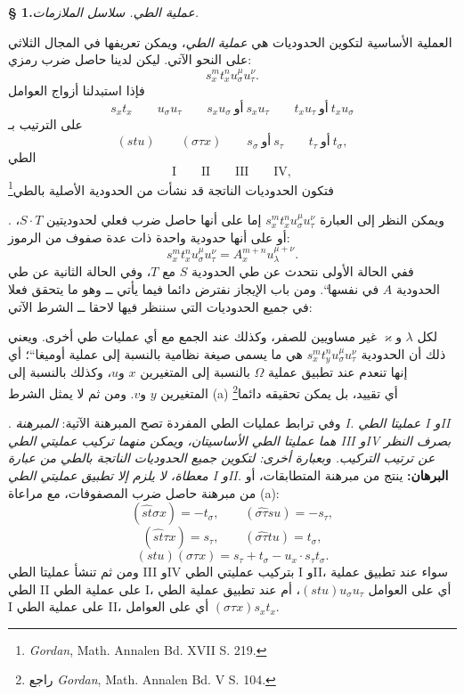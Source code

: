 \documentclass[11pt]{article}
\providecommand{\glqq}{\textquotedblbase}
\providecommand{\grqq}{\textquotedblleft}
\providecommand{\srcnumdisplay}[3][3.4em]{%
  \par\smallskip\noindent
  \babelsublr{\begin{minipage}[t]{#1}\vspace*{0pt}\srcLTR{#2}\end{minipage}%
  \begin{minipage}[t]{\dimexpr\linewidth-#1\relax}\vspace*{0pt}\centering
  \(\displaystyle #3\)\end{minipage}}\par\smallskip}
\newcommand{\srcLTR}[1]{\relax\ifmmode\text{\mbox{\babelsublr{\foreignlanguage{english}{#1}}}}\else\babelsublr{\foreignlanguage{english}{#1}}\fi}
\newcommand{\srcfn}[2]{\begingroup\renewcommand{\thefootnote}{\srcLTR{#1}}\footnote{#2}\addtocounter{footnote}{-1}\endgroup}
\begin{document}
\begin{center}
\textbf{§ 1.}\quad \emph{عملية الطي. سلاسل الملازمات.}
\end{center}

العملية الأساسية لتكوين الحدوديات هي \emph{عملية الطي}، ويمكن تعريفها في المجال الثلاثي على النحو الآتي. ليكن لدينا حاصل ضرب رمزي:
\[
s_x^m t_x^n u_\sigma^\mu u_\tau^\nu .
\]
فإذا استبدلنا أزواج العوامل
\[
s_xt_x\qquad u_\sigma u_\tau\qquad s_xu_\sigma\ \text{أو}\ s_xu_\tau
\qquad t_xu_\tau\ \text{أو}\ t_xu_\sigma
\]
على الترتيب بـ
\[
(stu)\qquad (\sigma\tau x)\qquad s_\sigma\ \text{أو}\ s_\tau
\qquad t_\tau\ \text{أو}\ t_\sigma,
\]
الطي
\[
\text{I}\qquad\text{II}\qquad\text{III}\qquad\text{IV},
\]
فتكون الحدوديات الناتجة قد نشأت من الحدودية الأصلية بالطي\srcfn{*)}{\emph{Gordan}, Math. Annalen Bd. XVII S. 219.}.
ويمكن النظر إلى العبارة $s_x^m t_x^n u_\sigma^\mu u_\tau^\nu$ إما على أنها حاصل ضرب فعلي لحدوديتين $S\cdot T$، أو على أنها حدودية واحدة ذات عدة صفوف من الرموز:
\[
s_x^m t_x^n u_\sigma^\mu u_\tau^\nu=A_x^{m+n}u_\lambda^{\mu+\nu}.
\]
ففي الحالة الأولى نتحدث عن طي الحدودية $S$ مع $T$، وفي الحالة الثانية عن \glqq{}طي الحدودية $A$ في نفسها\grqq{}. ومن باب الإيجاز نفترض دائما فيما يأتي ــ وهو ما يتحقق فعلا في جميع الحدوديات التي سننظر فيها لاحقا ــ الشرط الآتي:
\srcnumdisplay{(a)}{\begin{gathered}
s_\sigma^\lambda=0,\\
t_\tau^\varkappa=0
\end{gathered}}
لكل $\lambda$ و$\varkappa$ غير مساويين للصفر، وكذلك عند الجمع مع أي عمليات طي أخرى. ويعني ذلك أن الحدودية $s_x^m t_y^n u_\sigma^\mu u_\tau^\nu$ هي ما يسمى \glqq{}صيغة نظامية بالنسبة إلى عملية أوميغا\grqq{}؛ أي إنها تنعدم عند تطبيق عملية $\Omega$ بالنسبة إلى المتغيرين $x$ و$u$، وكذلك بالنسبة إلى المتغيرين $y$ و$v$.
ومن ثم لا يمثل الشرط (a) أي تقييد، بل يمكن تحقيقه دائما\srcfn{*)}{راجع \emph{Gordan}, Math. Annalen Bd. V S. 104.}.
وفي ترابط عمليات الطي المفردة تصح المبرهنة الآتية:
\emph{المبرهنة I. عمليتا الطي I وII هما عمليتا الطي الأساسيتان، ويمكن منهما تركيب عمليتي الطي III وIV بصرف النظر عن ترتيب التركيب. وبعبارة أخرى: لتكوين جميع الحدوديات الناتجة بالطي من عبارة معطاة، لا يلزم إلا تطبيق عمليتي الطي I وII.}
\textbf{البرهان:} ينتج من مبرهنة المتطابقات، أو من مبرهنة حاصل ضرب المصفوفات، مع مراعاة (a):
\[
(\widehat{st}\sigma x)=-t_\sigma,\qquad
(\widehat{\sigma\tau}su)=-s_\tau,
\]
\[
(\widehat{st}\tau x)=s_\tau,\qquad
(\widehat{\sigma\tau}tu)=t_\sigma,
\]
\[
(stu)(\sigma\tau x)=s_\tau+t_\sigma-u_x\cdot s_\tau t_\sigma .
\]
ومن ثم تنشأ عمليتا الطي III وIV بتركيب عمليتي الطي I وII، سواء عند تطبيق عملية الطي II على عملية الطي I، أي على العوامل $(stu)u_\sigma u_\tau$، أم عند تطبيق عملية الطي I على عملية الطي II، أي على العوامل $(\sigma\tau x)s_xt_x$.
\end{document}
